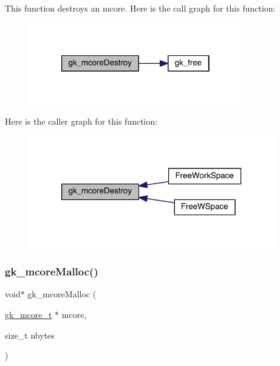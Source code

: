 This function destroys an mcore. Here is the call graph for this function\+:\nopagebreak
\begin{figure}[H]
\begin{center}
\leavevmode
\includegraphics[width=262pt]{a00107_acecd8b70b01b2b365695f034967c9536_cgraph}
\end{center}
\end{figure}
Here is the caller graph for this function\+:\nopagebreak
\begin{figure}[H]
\begin{center}
\leavevmode
\includegraphics[width=302pt]{a00107_acecd8b70b01b2b365695f034967c9536_icgraph}
\end{center}
\end{figure}
\mbox{\label{a00107_ab7a380f0696a0d5421653fad336bcae0}} 
\subsubsection{\texorpdfstring{gk\+\_\+mcore\+Malloc()}{gk\_mcoreMalloc()}}
{\footnotesize\ttfamily void$\ast$ gk\+\_\+mcore\+Malloc (\begin{DoxyParamCaption}\item[{\hyperlink{a00682}{gk\+\_\+mcore\+\_\+t} $\ast$}]{mcore,  }\item[{size\+\_\+t}]{nbytes }\end{DoxyParamCaption})}

